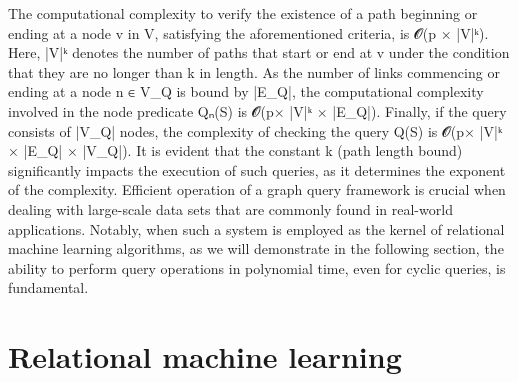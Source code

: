 \documentclass{article}%
\begin{document}
\newline%
The computational complexity to verify the existence of a path beginning or ending at a node v in V, satisfying the aforementioned criteria, is 𝓞(p × |V|ᵏ). Here, |V|ᵏ denotes the number of paths that start or end at v under the condition that they are no longer than k in length. As the number of links commencing or ending at a node n ∈ V\_Q is bound by |E\_Q|, the computational complexity involved in the node predicate Qₙ(S) is 𝓞(p× |V|ᵏ × |E\_Q|).\newline%
\newline%
Finally, if the query consists of |V\_Q| nodes, the complexity of checking the query Q(S) is 𝓞(p× |V|ᵏ × |E\_Q| × |V\_Q|). It is evident that the constant k (path length bound) significantly impacts the execution of such queries, as it determines the exponent of the complexity.\newline%
\newline%
Efficient operation of a graph query framework is crucial when dealing with large{-}scale data sets that are commonly found in real{-}world applications. Notably, when such a system is employed as the kernel of relational machine learning algorithms, as we will demonstrate in the following section, the ability to perform query operations in polynomial time, even for cyclic queries, is fundamental.

%
\clearpage%
\section{Relational machine learning}%
\label{sec:Relationalmachinelearning}%
\end{document}
